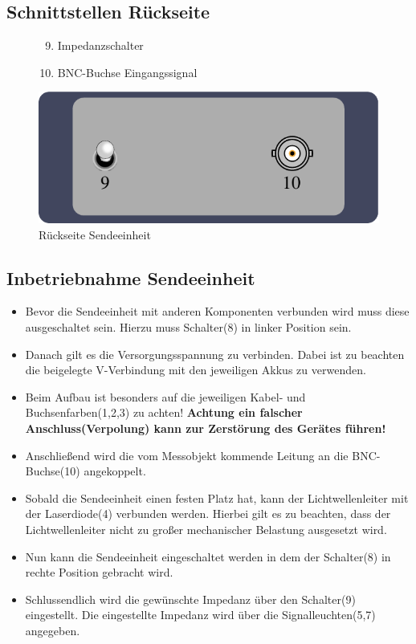 \documentclass[10pt,a4paper]{scrartcl}
\begin{document}
\subsection{Schnittstellen Rückseite}
\begin{figure}[H]
\begin{minipage}[t]{6cm}
\vspace{0pt}
\centering
\begin{enumerate}
\setcounter{enumi}{8}
\item Impedanzschalter
\item BNC-Buchse Eingangssignal
\end{enumerate}
\end{minipage}
\hfill
\begin{minipage}[t]{6.5cm}
\vspace{0pt}
\includegraphics[scale=0.7]{gfx/tx-back.pdf}
\caption{Rückseite Sendeeinheit}
\label{fig:tx-back}
\end{minipage}
\end{figure}

\subsection{Inbetriebnahme Sendeeinheit}
\begin{itemize}
\item Bevor die Sendeeinheit mit anderen Komponenten verbunden wird muss diese ausgeschaltet sein. Hierzu muss Schalter(8) in linker Position sein.
\item Danach gilt es die Versorgungsspannung zu verbinden. Dabei ist zu beachten die beigelegte V-Verbindung mit den jeweiligen Akkus zu verwenden.
\item Beim Aufbau ist besonders auf die jeweiligen Kabel- und Buchsenfarben(1,2,3) zu achten! \textbf{Achtung ein falscher Anschluss(Verpolung) kann zur Zerstörung des Gerätes führen!}
\item Anschließend wird die vom Messobjekt kommende Leitung an die BNC-Buchse(10) angekoppelt.
\item Sobald die Sendeeinheit einen festen Platz hat, kann der Lichtwellenleiter mit der Laserdiode(4) verbunden werden. Hierbei gilt es zu beachten, dass der Lichtwellenleiter nicht zu großer mechanischer Belastung ausgesetzt wird.
\item Nun kann die Sendeeinheit eingeschaltet werden in dem der Schalter(8) in rechte Position gebracht wird.
\item Schlussendlich wird die gewünschte Impedanz über den Schalter(9) eingestellt. Die eingestellte Impedanz wird über die Signalleuchten(5,7) angegeben.
\end{itemize}
\end{document}
